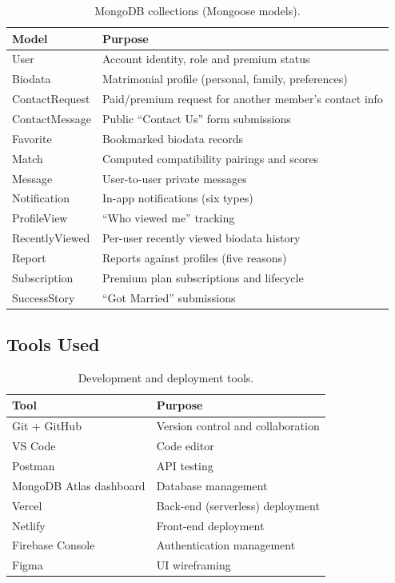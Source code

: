 \documentclass[12pt,a4paper]{report}
\begin{document}
\begin{table}[H]
\centering
\caption{MongoDB collections (Mongoose models).}
\label{tab:collections}
\small
\begin{tabularx}{\textwidth}{l X}
\toprule
\textbf{Model} & \textbf{Purpose} \\
\midrule
User            & Account identity, role and premium status \\
Biodata         & Matrimonial profile (personal, family, preferences) \\
ContactRequest  & Paid/premium request for another member's contact info \\
ContactMessage  & Public ``Contact Us'' form submissions \\
Favorite        & Bookmarked biodata records \\
Match           & Computed compatibility pairings and scores \\
Message         & User-to-user private messages \\
Notification    & In-app notifications (six types) \\
ProfileView     & ``Who viewed me'' tracking \\
RecentlyViewed  & Per-user recently viewed biodata history \\
Report          & Reports against profiles (five reasons) \\
Subscription    & Premium plan subscriptions and lifecycle \\
SuccessStory    & ``Got Married'' submissions \\
\bottomrule
\end{tabularx}
\end{table}

\subsection{Tools Used}
\begin{table}[H]
\centering
\caption{Development and deployment tools.}
\label{tab:tools}
\small
\begin{tabularx}{\textwidth}{l X}
\toprule
\textbf{Tool} & \textbf{Purpose} \\
\midrule
Git + GitHub            & Version control and collaboration \\
VS Code                 & Code editor \\
Postman                 & API testing \\
MongoDB Atlas dashboard & Database management \\
Vercel                  & Back-end (serverless) deployment \\
Netlify                 & Front-end deployment \\
Firebase Console        & Authentication management \\
Figma                   & UI wireframing \\
\bottomrule
\end{tabularx}
\end{table}
\end{document}
